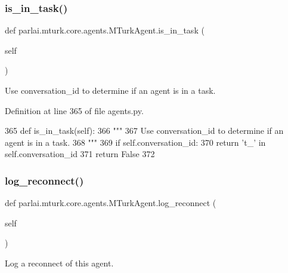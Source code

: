 \subsubsection{\texorpdfstring{is\+\_\+in\+\_\+task()}{is\_in\_task()}}
{\footnotesize\ttfamily def parlai.\+mturk.\+core.\+agents.\+M\+Turk\+Agent.\+is\+\_\+in\+\_\+task (\begin{DoxyParamCaption}\item[{}]{self }\end{DoxyParamCaption})}

\begin{DoxyVerb}Use conversation_id to determine if an agent is in a task.
\end{DoxyVerb}
 

Definition at line 365 of file agents.\+py.


\begin{DoxyCode}
365     \textcolor{keyword}{def }is\_in\_task(self):
366         \textcolor{stringliteral}{"""}
367 \textcolor{stringliteral}{        Use conversation\_id to determine if an agent is in a task.}
368 \textcolor{stringliteral}{        """}
369         \textcolor{keywordflow}{if} self.conversation\_id:
370             \textcolor{keywordflow}{return} \textcolor{stringliteral}{'t\_'} \textcolor{keywordflow}{in} self.conversation\_id
371         \textcolor{keywordflow}{return} \textcolor{keyword}{False}
372 
\end{DoxyCode}
\mbox{\label{classparlai_1_1mturk_1_1core_1_1agents_1_1MTurkAgent_a989a5ebbfea27129167087af818e4f6d}} 
\subsubsection{\texorpdfstring{log\+\_\+reconnect()}{log\_reconnect()}}
{\footnotesize\ttfamily def parlai.\+mturk.\+core.\+agents.\+M\+Turk\+Agent.\+log\+\_\+reconnect (\begin{DoxyParamCaption}\item[{}]{self }\end{DoxyParamCaption})}

\begin{DoxyVerb}Log a reconnect of this agent.
\end{DoxyVerb}
 


